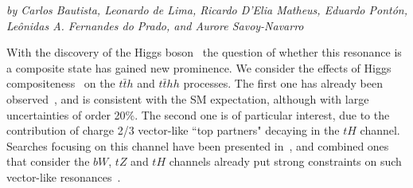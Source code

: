 \begin{center}
{\it{by Carlos Bautista, Leonardo de Lima, Ricardo D'Elia Matheus, Eduardo Pont\'on, Le\^onidas A. Fernandes do Prado, and Aurore Savoy-Navarro}}
\end{center}

\label{sec9:MCHMtthh}
With the discovery of the Higgs boson~\cite{Aad:2012tfa,
CMSHiggsJuly2012} the question of whether this resonance is a
composite state has gained new prominence.  We consider the effects of
Higgs compositeness~\cite{Kaplan:1983fs, Kaplan:1983sm, Georgi:1984ef, Georgi:1984af, Dugan:1984hq} on the $t\bar{t}h$ and
$t\bar{t}  h h$ processes.  The first one has already been
observed~\cite{Aaboud:2018urx, Sirunyan:2018hoz}, and is consistent
with the SM expectation, although with large uncertainties of order
20\%.  The second one is of particular interest, due to the contribution of charge 2/3 vector-like ``top partners" decaying in the $tH$ channel. Searches focusing on
this channel have been presented in~\cite{Aaboud:2018xuw}, and
combined ones that consider the $bW$, $tZ$ and $tH$ channels
already put strong constraints on such vector-like
resonances~\cite{Aaboud:2018pii, Sirunyan:2018omb}.
